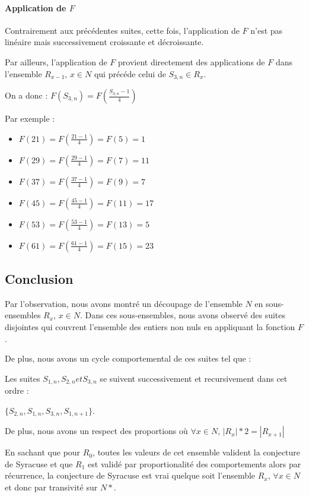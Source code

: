 \documentclass{book}
\begin{document}
\paragraph{Application de $F$}

Contrairement aux pr\'ec\'edentes suites, cette fois, l'application de $F$ n'est pas lin\'eaire mais successivement croissante et d\'ecroissante.

Par ailleurs, l'application de $F$ provient directement des applications de $F$ dans l'ensemble $R_{x-1}$, $x \in N$ qui pr\'ec\'ede celui de $S_{3,n} \in R_x$.

On a donc : $F(S_{3,n}) = F(\frac{S_{3,n} - 1}{4})$

Par exemple :

\begin{itemize}
	\item $F(21) = F(\frac{21 - 1}{4}) = F(5) = 1$
	\item $F(29) = F(\frac{29 - 1}{4}) = F(7) = 11$
	\item $F(37) = F(\frac{37 - 1}{4}) = F(9) = 7$
	\item $F(45) = F(\frac{45 - 1}{4}) = F(11) = 17$
	\item $F(53) = F(\frac{53 - 1}{4}) = F(13) = 5$
	\item $F(61) = F(\frac{61 - 1}{4}) = F(15) = 23$
\end{itemize}

\subsection{Conclusion}

Par l'observation, nous avons montr\'e un d\'ecoupage de l'ensemble $N$ en sous-ensembles $R_x$, $x \in N$.
Dans ces sous-ensembles, nous avons observ\'e des suites disjointes qui couvrent l'ensemble des entiers non nuls en appliquant la fonction $F$.

De plus, nous avons un cycle comportemental de ces suites tel que :

Les suites $S_{1,n}, S_{2,n} et S_{3,n}$ se suivent successivement et recursivement dans cet ordre :

$\{S_{2,n}, S_{1,n}, S_{3,n}, S_{1,n+1}\}$.

De plus, nous avons un respect des proportions o\`u $\forall x \in N$, $|R_x| * 2 = |R_{x+1}|$

En sachant que pour $R_0$, toutes les valeurs de cet ensemble valident la conjecture de Syracuse et que $R_1$ est valid\'e par proportionalit\'e des comportements alors par r\'ecurrence, la conjecture de Syracuse est vrai quelque soit l'ensemble $R_x$, $\forall x \in N$ et donc par transivit\'e sur $N*$.

\label{end}
\end{document}
